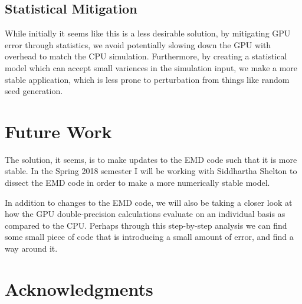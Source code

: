 \documentclass[fleqn,10pt]{SelfArx} %
\begin{document}
        \subsection{Statistical Mitigation}
            While initially it seems like this is a less desirable solution, by mitigating GPU error through statistics, we avoid potentially slowing down the GPU with overhead to match the CPU simulation. Furthermore, by creating a statistical model which can accept small variences in the simulation input, we make a more stable application, which is less prone to perturbation from things like random seed generation.

\section{Future Work}
The solution, it seems, is to make updates to the EMD code such that it is more stable. In the Spring 2018 semester I will be working with Siddhartha Shelton to dissect the EMD code in order to make a more numerically stable model.

In addition to changes to the EMD code, we will also be taking a closer look at how the GPU double-precision calculations evaluate on an individual basis as compared to the CPU. Perhaps through this step-by-step analysis we can find some small piece of code that is introducing a small amount of error, and find a way around it.

\section*{Acknowledgments} %






\end{document}
